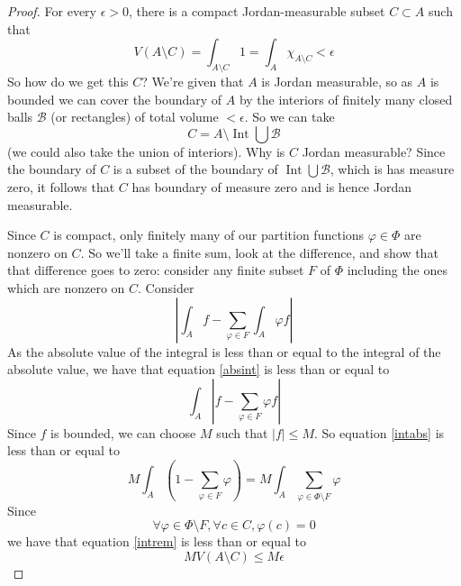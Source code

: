 \documentclass{article}
\DeclareMathOperator{\Int}{Int}
\newcommand{\mc}[1]{\mathcal{#1}}
\begin{document}
\begin{proof}
  For every \(\epsilon > 0\), there is a compact Jordan-measurable subset \(C \subset A\) such that \begin{equation}
    V(A \setminus C) = \int_{A \setminus C}1 = \int_A\chi_{A \setminus C} < \epsilon
  \end{equation}
  So how do we get this \(C\)? We're given that \(A\) is Jordan measurable, so as \(A\) is bounded we can cover the boundary of \(A\) by the interiors of finitely many closed balls \(\mc{B}\) (or rectangles) of total volume \(< \epsilon\). So we can take
  \begin{equation}
    C = A \setminus \Int\bigcup\mc{B}
  \end{equation}
  (we could also take the union of interiors). Why is \(C\) Jordan measurable? Since the boundary of \(C\) is a subset of the boundary of \(\Int\bigcup\mc{B}\), which is has measure zero, it follows that \(C\) has boundary of measure zero and is hence Jordan measurable.

  Since \(C\) is compact, only finitely many of our partition functions \(\varphi \in \Phi\) are nonzero on \(C\). So we'll take a finite sum, look at the difference, and show that that difference goes to zero: consider any finite subset \(F\) of \(\Phi\) including the ones which are nonzero on \(C\). Consider
  \begin{equation}
    \left|\int_Af - \sum_{\varphi \in F}\int_A\varphi f\right|
    \label{absint}
  \end{equation}
  As the absolute value of the integral is less than or equal to the integral of the absolute value, we have that equation \ref{absint} is less than or equal to
  \begin{equation}
    \int_A\left|f - \sum_{\varphi \in F}\varphi f\right|
    \label{intabs}
  \end{equation}
  Since \(f\) is bounded, we can choose \(M\) such that \(|f| \leq M\). So equation \ref{intabs} is less than or equal to
  \begin{equation}
    M\int_A\left(1 - \sum_{\varphi \in F}\varphi\right)
    = M \int_A\sum_{\varphi \in \Phi \setminus F}\varphi
    \label{intrem}
  \end{equation}
  Since
  \begin{equation}
    \forall \varphi \in \Phi \setminus F, \forall c \in C, \varphi(c) = 0
  \end{equation}
  we have that equation \ref{intrem} is less than or equal to
  \begin{equation}
    MV(A \setminus C) \leq M\epsilon
  \end{equation}

\end{proof}
\end{document}
